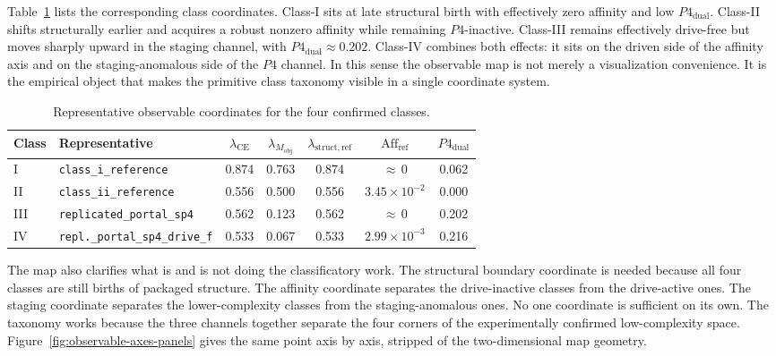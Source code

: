 \documentclass[11pt]{article}
\begin{document}
Table~\ref{tab:four-class-observable-coordinates} lists the corresponding class coordinates. Class-I sits at late structural birth with effectively zero affinity and low $P4_{\mathrm{dual}}$. Class-II shifts structurally earlier and acquires a robust nonzero affinity while remaining $P4$-inactive. Class-III remains effectively drive-free but moves sharply upward in the staging channel, with $P4_{\mathrm{dual}}\approx 0.202$. Class-IV combines both effects: it sits on the driven side of the affinity axis and on the staging-anomalous side of the $P4$ channel. In this sense the observable map is not merely a visualization convenience. It is the empirical object that makes the primitive class taxonomy visible in a single coordinate system.

\begin{table}[tbp]
\centering
\small
\caption{Representative observable coordinates for the four confirmed classes.}
\label{tab:four-class-observable-coordinates}
\setlength{\tabcolsep}{5pt}
\begin{tabular}{@{}llccccc@{}}
\toprule
Class & Representative
  & $\lambda_{\mathrm{CE}}$
  & $\lambda_{M_{\mathrm{obj}}}$
  & $\lambda_{\mathrm{struct,ref}}$
  & $\mathrm{Aff}_{\mathrm{ref}}$
  & $P4_{\mathrm{dual}}$ \\
\midrule
I   & \texttt{class\_i\_reference}   & 0.874 & 0.763 & 0.874 & ${\approx}\,0$             & 0.062 \\
II  & \texttt{class\_ii\_reference}  & 0.556 & 0.500 & 0.556 & $3.45\times 10^{-2}$ & 0.000 \\
III & \texttt{replicated\_portal\_sp4}        & 0.562 & 0.123 & 0.562 & ${\approx}\,0$             & 0.202 \\
IV  & \texttt{repl.\_portal\_sp4\_drive\_f} & 0.533 & 0.067 & 0.533 & $2.99\times 10^{-3}$ & 0.216 \\
\bottomrule
\end{tabular}
\end{table}

The map also clarifies what is and is not doing the classificatory work. The structural boundary coordinate is needed because all four classes are still births of packaged structure. The affinity coordinate separates the drive-inactive classes from the drive-active ones. The staging coordinate separates the lower-complexity classes from the staging-anomalous ones. No one coordinate is sufficient on its own. The taxonomy works because the three channels together separate the four corners of the experimentally confirmed low-complexity space. Figure~\ref{fig:observable-axes-panels} gives the same point axis by axis, stripped of the two-dimensional map geometry.
\end{document}
